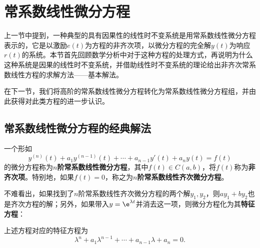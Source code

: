 \section{常系数线性微分方程}\label{sec:ODE}

上一节中提到，一种典型的具有因果性的线性时不变系统是用常系数线性微分方程表示的，它是以激励$e(t)$为方程的非齐次项，以微分方程的完全解$y(t)$为响应$r(t)$的系统。本节首先回顾数学分析中对于这种方程的处理方式，再说明为什么这种系统是因果的线性时不变系统，并借助线性时不变系统的理论给出非齐次常系数线性方程的求解方法——基本解法。

在下一节，我们将高阶的常系数线性微分方程转化为常系数线性微分方程组，并由此获得对此类方程的进一步认识。

\subsection{常系数线性微分方程的经典解法}\label{sub:solution_of_ODE}

\begin{definition}[常系数线性微分方程]
    一个形如
    \begin{equation}
        y^{(n)}(t)+a_{1}y^{(n-1)}(t)+\cdots +a_{n-1} y'(t)+a_n y(t)=f(t)
    \end{equation}
    的微分方程称为\textbf{$n$阶常系数线性微分方程}，其中$f(t)\in C(a,b)$，将$f(t)$称为\textbf{非齐次项}。特别地，如果$f(t)=0$，称之为\textbf{$n$阶常系数线性齐次微分方程}。
\end{definition}

不难看出，如果找到了$n$阶常系数线性齐次微分方程的两个解$y_1,y_2$，则$ay_1+by_2$也是齐次方程的解；另外，如果带入$y=\e^{\lambda t}$并消去这一项，则微分方程化为其\textbf{特征方程}：
\begin{definition}[特征方程]
    上述方程对应的特征方程为
    \begin{equation}
        \lambda^n+a_{1}\lambda^{n-1}+\cdots+a_{n-1}\lambda+a_n=0.
    \end{equation}
\end{definition}

